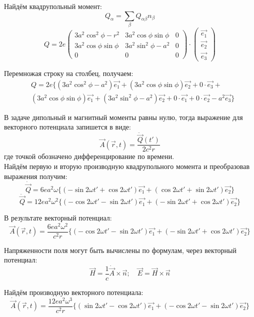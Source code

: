 Найдём квадрупольный момент:
\[ Q_\alpha = \sum_\beta Q_{\alpha\beta}n_\beta \]
\[ 
	Q = 2e \left(\begin{array}{ccc}
		3a^2\cos^2\phi - r^2 & 3a^2\cos\phi\sin\phi & 0 \\
		3a^2\cos\phi\sin\phi & 3a^2\sin^2\phi - a^2 & 0 \\
		0 					 & 0 					& 0
	\end{array}\right) 
	\cdot \left(\begin{array}{c} 
		\vec{e_1} \\
		\vec{e_2} \\
		\vec{e_3} 
	\end{array}\right)
\]

Перемножая строку на столбец, получаем:
\begin{align*}
	& Q = 2e \Big\{
		\left( 3a^2\cos^2\phi - a^2\right)\vec{e_1} + 
		\left( 3a^2\cos\phi\sin\phi \right)\vec{e_2} + 
		0\cdot\vec{e_3} + \\
	&	\left( 3a^2\cos\phi\sin\phi \right)\vec{e_1} +
		\left( 3a^2\sin^2\phi - a^2 \right)\vec{e_2} + 
		0\cdot\vec{e_1} + 0\cdot\vec{e_2} - a^2\vec{e_3}
	\Big\}
\end{align*}

В задаче дипольный и магнитный моменты равны нулю, тогда выражение 
для векторного потенциала запишется в виде: 
\[ 
	\vec{A}(\vec{r}, t) = \frac{\ddot{\vec{Q}}(t')}{2c^2 r}
\]
где точкой обозначено дифференцирование по времени.\\

Найдём первую и вторую производную квадрупольного момента и преобразовав выражения получим:
\[
	\dot{\vec{Q}} = 6ea^2\omega 
	\Big\{
		\left( -\sin{2\omega t'} + \cos{2\omega t'} \right)\vec{e_1} + 
		\left( \cos{2\omega t'} + \sin{2\omega t'} \right)\vec{e_2}
	\Big\}
\]
\[
	\ddot{\vec{Q}} = 12ea^2\omega^2 
	\Big\{
		\left( -\cos{2\omega t'} -\sin{2\omega t'} \right)\vec{e_1} + 
		\left( -\sin{2\omega t'} + \cos{2\omega t'} \right)\vec{e_2}
	\Big\}
\]

В результате векторный потенциал:
\[ 
	\vec{A}(\vec{r}, t) = \frac{6ea^2\omega^2}{c^2r}
	\Big\{
		\left( -\cos{2\omega t'} - \sin{2\omega t'} \right)\vec{e_1} + 
		\left( -\sin{2\omega t'} + \cos{2\omega t'} \right)\vec{e_2}
	\Big\}
\]

Напряженности поля могут быть вычислены по формулам, через векторный потенциал: 
\[ 
	\vec{H}=\frac{1}{c}\dot{\vec{A}}\times\vec{n};\quad
	\vec{E}=\vec{H}\times\vec{n}
\]

Найдём производную векторного потенциала:
\[ 
	\dot{\vec{A}}(\vec{r}, t) = \frac{12ea^2\omega^3}{c^2r}
	\Big\{
		\left(\sin{2\omega t'} - \cos{2\omega t'}\right)\vec{e_1} + 
		\left(-\cos{2\omega t'} - \sin{2\omega t'}\right)\vec{e_2}
	\Big\}
\]

